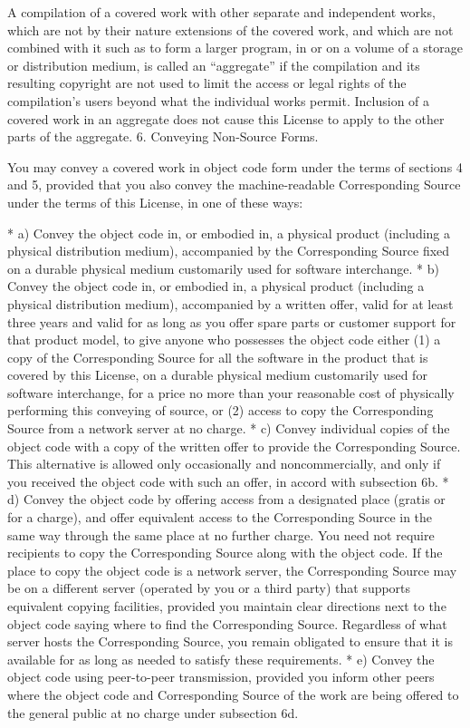 {\begin{multicols}{4}
A compilation of a covered work with other separate and independent works, which are not by their nature extensions of the covered work, and which are not combined with it such as to form a larger program, in or on a volume of a storage or distribution medium, is called an “aggregate” if the compilation and its resulting copyright are not used to limit the access or legal rights of the compilation's users beyond what the individual works permit. Inclusion of a covered work in an aggregate does not cause this License to apply to the other parts of the aggregate.
6. Conveying Non-Source Forms.

You may convey a covered work in object code form under the terms of sections 4 and 5, provided that you also convey the machine-readable Corresponding Source under the terms of this License, in one of these ways:

    * a) Convey the object code in, or embodied in, a physical product (including a physical distribution medium), accompanied by the Corresponding Source fixed on a durable physical medium customarily used for software interchange.
    * b) Convey the object code in, or embodied in, a physical product (including a physical distribution medium), accompanied by a written offer, valid for at least three years and valid for as long as you offer spare parts or customer support for that product model, to give anyone who possesses the object code either (1) a copy of the Corresponding Source for all the software in the product that is covered by this License, on a durable physical medium customarily used for software interchange, for a price no more than your reasonable cost of physically performing this conveying of source, or (2) access to copy the Corresponding Source from a network server at no charge.
    * c) Convey individual copies of the object code with a copy of the written offer to provide the Corresponding Source. This alternative is allowed only occasionally and noncommercially, and only if you received the object code with such an offer, in accord with subsection 6b.
    * d) Convey the object code by offering access from a designated place (gratis or for a charge), and offer equivalent access to the Corresponding Source in the same way through the same place at no further charge. You need not require recipients to copy the Corresponding Source along with the object code. If the place to copy the object code is a network server, the Corresponding Source may be on a different server (operated by you or a third party) that supports equivalent copying facilities, provided you maintain clear directions next to the object code saying where to find the Corresponding Source. Regardless of what server hosts the Corresponding Source, you remain obligated to ensure that it is available for as long as needed to satisfy these requirements.
    * e) Convey the object code using peer-to-peer transmission, provided you inform other peers where the object code and Corresponding Source of the work are being offered to the general public at no charge under subsection 6d.


\end{multicols}}

